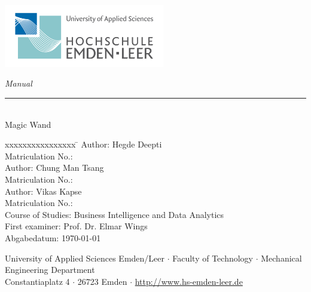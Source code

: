 %
%

\begin{titlepage}
    
    \begin{flushleft} 
        \includegraphics[width=7cm]{General/Logo.png}
    \end{flushleft} 
    
    \begin{flushright}
        \vspace{2cm}
        \LARGE \textsl{Manual}\\
        \rule{0.6\textwidth}{0.4pt} ~\\
        \vspace{0.5cm}
        \textsf{\LARGE Magic Wand}\\
    \end{flushright}
    
    \vspace{2cm}
    \large
    \begin{tabbing}
       xxxxxxxxxxxxxxxx \= \kill
       Author: \> Hegde Deepti \\
       Matriculation No.:  \\ 
       Author: \> Chung Man Tsang \\
       Matriculation No.:  \\
       Author: \> Vikas Kapse \\
       Matriculation No.:  \\ [0.5cm]
       Course of Studies: \> Business Intelligence and Data Analytics \\ [0.5cm]
       First examiner: \> Prof. Dr. Elmar Wings \\
       [0.5cm]
        Abgabedatum: \> \today \\
    \end{tabbing}
    
    \vspace{2cm}
    \small
    \begin{center}
        University of Applied Sciences Emden/Leer $\cdot$ 
        Faculty of Technology $\cdot$ 
        Mechanical Engineering Department \\
        Constantiaplatz 4 $\cdot$ 
        26723 Emden $\cdot$ 
        \url{http://www.hs-emden-leer.de}
    \end{center}
    
\end{titlepage}
